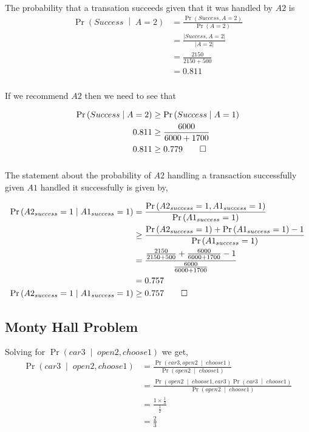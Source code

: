 \documentclass[letterpaper,10pt]{article} %
\newcommand{\pipe}{\;\middle\vert\;}
\newcommand{\condp}[2]{\Pr\left( #1 \pipe #2 \right)}
\newcommand{\pr}[1]{\Pr\left( #1 \right)}
\newcommand{\condpe}[2]{\frac{\pr{#1,#2}}{\pr{#2}}}
\newcommand{\norm}[1]{\left|#1\right|}
\newcommand{\prove}[1]{
\begin{Proof}
\begin{align*}
#1
\end{align*}
\end{Proof}
}
\begin{document}
\subsubsection{}
The probability that a transation succeeds given that it was handled by $A2$ is
\begin{align*}
\condp{Success}{A=2} &= \condpe{Success}{A=2}\\
&= \frac{\norm{Success, A=2}}{\norm{A=2}}\\
&= \frac{2150}{2150+500}\\
&= 0.811
\end{align*}

\subsubsection{}
If we recommend $A2$ then we need to see that
\prove{
\condp{Success}{A=2} &\geq \condp{Success}{A=1}\\
0.811 &\geq \frac{6000}{6000+1700}\\
0.811 &\geq 0.779 \qedhere
}

\subsubsection{}
The statement about the probability of $A2$ handling a transaction successfully given $A1$ handled it successfully is given by,
\prove{
\condp{A2_{success}=1}{A1_{success}=1} &= \condpe{A2_{success}=1}{A1_{success}=1}\\
&\geq \frac{\pr{A2_{success}=1}+\pr{A1_{success}=1}-1}{\pr{A1_{success}=1}}\\
&= \frac{\frac{2150}{2150+500}+\frac{6000}{6000+1700}-1}{\frac{6000}{6000+1700}}\\
&= 0.757 \\
\condp{A2_{success}=1}{A1_{success}=1} &\geq 0.757 \qedhere
}

\subsection{Monty Hall Problem}

Solving for $\pr{car3 \pipe open2, choose1}$ we get,
\begin{align*}
 \pr{car3 \pipe open2, choose1} &= \frac{\condp{car3, open2}{choose1}}{\condp{open2}{choose1}}\\
 &=\frac{\condp{open2}{choose1,car3}\condp{car3}{choose1}}{\condp{open2}{choose1}} \\
 &=\frac{1 \times \tfrac{1}{3}}{\tfrac{1}{2}} \\
 &=\tfrac{2}{3}
\end{align*}
\end{document}
